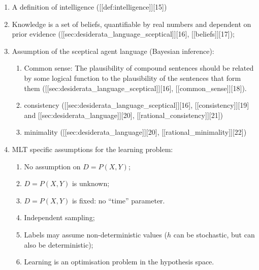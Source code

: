 \documentclass[
  letterpaper,
  12pt,
  british]{tufte-book}
\theoremstyle{plain}
\theoremstyle{definition}
\theoremstyle{plain}
\theoremstyle{remark}
\begin{document}
\begin{enumerate}
\def\labelenumi{\arabic{enumi}.}
\item
  A definition of intelligence ({[}{[}def:intelligence{]}{]}{[}15{]})
\item
  Knowledge is a set of beliefs, quantifiable by real numbers and
  dependent on prior evidence
  ({[}{[}sec:desiderata\_language\_sceptical{]}{]}{[}16{]},
  {[}{[}beliefs{]}{]}{[}17{]});
\item
  Assumption of the sceptical agent language (Bayesian inference):

  \begin{enumerate}
  \def\labelenumii{\arabic{enumii}.}
  \item
    Common sense: The plausibility of compound sentences should be
    related by some logical function to the plausibility of the
    sentences that form them
    ({[}{[}sec:desiderata\_language\_sceptical{]}{]}{[}16{]},
    {[}{[}common\_sense{]}{]}{[}18{]}).
  \item
    consistency
    ({[}{[}sec:desiderata\_language\_sceptical{]}{]}{[}16{]},
    {[}{[}consistency{]}{]}{[}19{]} and
    {[}{[}sec:desiderata\_language{]}{]}{[}20{]},
    {[}{[}rational\_consistency{]}{]}{[}21{]})
    \protect\hypertarget{consistency_assumption}{}{}
  \item
    minimality ({[}{[}sec:desiderata\_language{]}{]}{[}20{]},
    {[}{[}rational\_minimality{]}{]}{[}22{]})
  \end{enumerate}
\item
  {MLT} specific assumptions for the learning
  problem:\protect\hypertarget{mlt_specific_assumptions}{}{}

  \begin{enumerate}
  \def\labelenumii{\arabic{enumii}.}
  \item
    No assumption on \(D=P(\mathit{X},\mathit{Y})\);
  \item
    \(D=P(\mathit{X},\mathit{Y})\) is unknown;
  \item
    \(D=P(\mathit{X},\mathit{Y})\) is fixed: no ``time'' parameter.
  \item
    Independent sampling;\protect\hypertarget{fixed_assumption}{}{}
  \item
    Labels may assume non-deterministic values (\(h\) can be stochastic,
    but can also be deterministic);
  \item
    Learning is an optimisation problem in the hypothesis space.
  \end{enumerate}
\end{enumerate}
\end{document}
